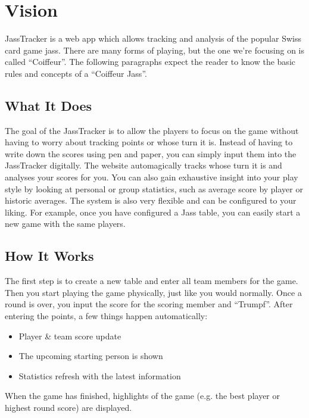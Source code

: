 \chapter{Vision}

JassTracker is a web app which allows tracking and analysis of the popular Swiss card game \gls{jass}.
There are many forms of playing, but the one we're focusing on is called ``Coiffeur''.
The following paragraphs expect the reader to know the basic rules and concepts of a ``Coiffeur Jass''.

\section*{What It Does}
The goal of the JassTracker is to allow the players to focus on the game without having to worry about tracking points or whose turn it is.
Instead of having to write down the scores using pen and paper, you can simply input them into the JassTracker digitally.
The website automagically tracks whose turn it is and analyses your scores for you.
You can also gain exhaustive insight into your play style by looking at personal or group statistics, such as average score by player or historic averages.
The system is also very flexible and can be configured to your liking.
For example, once you have configured a Jass table, you can easily start a new game with the same players.

\section*{How It Works}
The first step is to create a new table and enter all team members for the game.
Then you start playing the game physically, just like you would normally.
Once a round is over, you input the score for the scoring member and ``Trumpf''.
After entering the points, a few things happen automatically:
\begin{itemize}
    \item Player \& team score update
    \item The upcoming starting person is shown
    \item Statistics refresh with the latest information
\end{itemize}
When the game has finished, highlights of the game (e.g. the best player or highest round score) are displayed.

